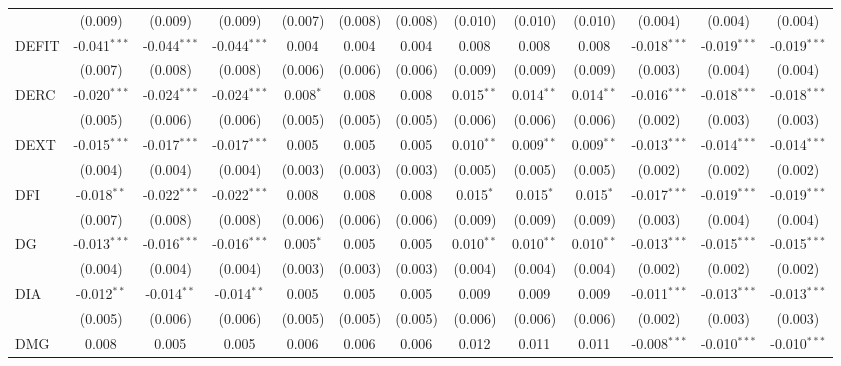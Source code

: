 \begin{table}[!htbp]
\begin{tabular}{@{\extracolsep{5pt}}lcccccccccccc}
  & (0.009) & (0.009) & (0.009) & (0.007) & (0.008) & (0.008) & (0.010) & (0.010) & (0.010) & (0.004) & (0.004) & (0.004) \\
 DEFIT & -0.041$^{***}$ & -0.044$^{***}$ & -0.044$^{***}$ & 0.004$^{}$ & 0.004$^{}$ & 0.004$^{}$ & 0.008$^{}$ & 0.008$^{}$ & 0.008$^{}$ & -0.018$^{***}$ & -0.019$^{***}$ & -0.019$^{***}$ \\
  & (0.007) & (0.008) & (0.008) & (0.006) & (0.006) & (0.006) & (0.009) & (0.009) & (0.009) & (0.003) & (0.004) & (0.004) \\
 DERC & -0.020$^{***}$ & -0.024$^{***}$ & -0.024$^{***}$ & 0.008$^{*}$ & 0.008$^{}$ & 0.008$^{}$ & 0.015$^{**}$ & 0.014$^{**}$ & 0.014$^{**}$ & -0.016$^{***}$ & -0.018$^{***}$ & -0.018$^{***}$ \\
  & (0.005) & (0.006) & (0.006) & (0.005) & (0.005) & (0.005) & (0.006) & (0.006) & (0.006) & (0.002) & (0.003) & (0.003) \\
 DEXT & -0.015$^{***}$ & -0.017$^{***}$ & -0.017$^{***}$ & 0.005$^{}$ & 0.005$^{}$ & 0.005$^{}$ & 0.010$^{**}$ & 0.009$^{**}$ & 0.009$^{**}$ & -0.013$^{***}$ & -0.014$^{***}$ & -0.014$^{***}$ \\
  & (0.004) & (0.004) & (0.004) & (0.003) & (0.003) & (0.003) & (0.005) & (0.005) & (0.005) & (0.002) & (0.002) & (0.002) \\
 DFI & -0.018$^{**}$ & -0.022$^{***}$ & -0.022$^{***}$ & 0.008$^{}$ & 0.008$^{}$ & 0.008$^{}$ & 0.015$^{*}$ & 0.015$^{*}$ & 0.015$^{*}$ & -0.017$^{***}$ & -0.019$^{***}$ & -0.019$^{***}$ \\
  & (0.007) & (0.008) & (0.008) & (0.006) & (0.006) & (0.006) & (0.009) & (0.009) & (0.009) & (0.003) & (0.004) & (0.004) \\
 DG & -0.013$^{***}$ & -0.016$^{***}$ & -0.016$^{***}$ & 0.005$^{*}$ & 0.005$^{}$ & 0.005$^{}$ & 0.010$^{**}$ & 0.010$^{**}$ & 0.010$^{**}$ & -0.013$^{***}$ & -0.015$^{***}$ & -0.015$^{***}$ \\
  & (0.004) & (0.004) & (0.004) & (0.003) & (0.003) & (0.003) & (0.004) & (0.004) & (0.004) & (0.002) & (0.002) & (0.002) \\
 DIA & -0.012$^{**}$ & -0.014$^{**}$ & -0.014$^{**}$ & 0.005$^{}$ & 0.005$^{}$ & 0.005$^{}$ & 0.009$^{}$ & 0.009$^{}$ & 0.009$^{}$ & -0.011$^{***}$ & -0.013$^{***}$ & -0.013$^{***}$ \\
  & (0.005) & (0.006) & (0.006) & (0.005) & (0.005) & (0.005) & (0.006) & (0.006) & (0.006) & (0.002) & (0.003) & (0.003) \\
 DMG & 0.008$^{}$ & 0.005$^{}$ & 0.005$^{}$ & 0.006$^{}$ & 0.006$^{}$ & 0.006$^{}$ & 0.012$^{}$ & 0.011$^{}$ & 0.011$^{}$ & -0.008$^{***}$ & -0.010$^{***}$ & -0.010$^{***}$ \\

\end{tabular}
\end{table}

